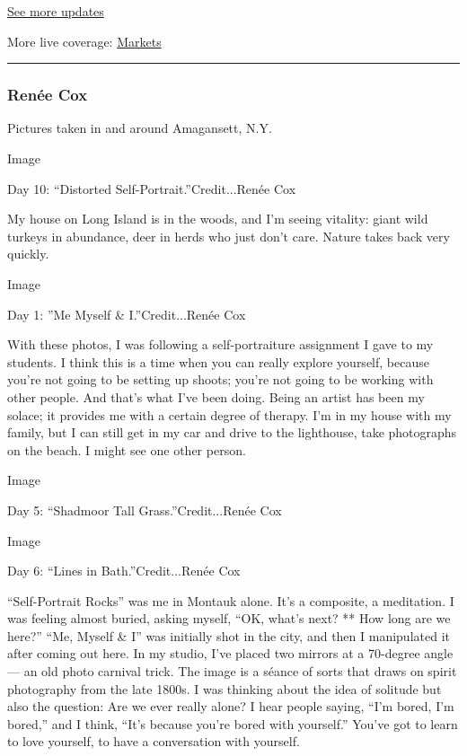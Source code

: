 \href{https://www.nytimes3xbfgragh.onion/2020/09/08/world/covid-19-coronavirus.html?action=click\&pgtype=Article\&state=default\&region=MAIN_CONTENT_1\&context=storylines_live_updates}{See
more updates}

More live coverage:
\href{https://www.nytimes3xbfgragh.onion/live/2020/09/08/business/stock-market-today-coronavirus?action=click\&pgtype=Article\&state=default\&region=MAIN_CONTENT_1\&context=storylines_live_updates}{Markets}

\begin{center}\rule{0.5\linewidth}{\linethickness}\end{center}

\hypertarget{renuxe9e-cox}{%
\subsubsection{Renée Cox}\label{renuxe9e-cox}}

Pictures taken in and around Amagansett, N.Y.

Image

Day 10: ``Distorted Self-Portrait.''Credit...Renée Cox

My house on Long Island is in the woods, and I'm seeing vitality: giant
wild turkeys in abundance, deer in herds who just don't care. Nature
takes back very quickly.

Image

Day 1: ''Me Myself \& I.''Credit...Renée Cox

With these photos, I was following a self-portraiture assignment I gave
to my students. I think this is a time when you can really explore
yourself, because you're not going to be setting up shoots; you're not
going to be working with other people. And that's what I've been doing.
Being an artist has been my solace; it provides me with a certain degree
of therapy. I'm in my house with my family, but I can still get in my
car and drive to the lighthouse, take photographs on the beach. I might
see one other person.

Image

Day 5: ``Shadmoor Tall Grass.''Credit...Renée Cox

Image

Day 6: ``Lines in Bath.''Credit...Renée Cox

``Self-Portrait Rocks'' was me in Montauk alone. It's a composite, a
meditation. I was feeling almost buried, asking myself, ``OK, what's
next? ** How long are we here?'' ``Me, Myself \& I'' was initially shot
in the city, and then I manipulated it after coming out here. In my
studio, I've placed two mirrors at a 70-degree angle --- an old photo
carnival trick. The image is a séance of sorts that draws on spirit
photography from the late 1800s. I was thinking about the idea of
solitude but also the question: Are we ever really alone? I hear people
saying, ``I'm bored, I'm bored,'' and I think, ``It's because you're
bored with yourself.'' You've got to learn to love yourself, to have a
conversation with yourself.

